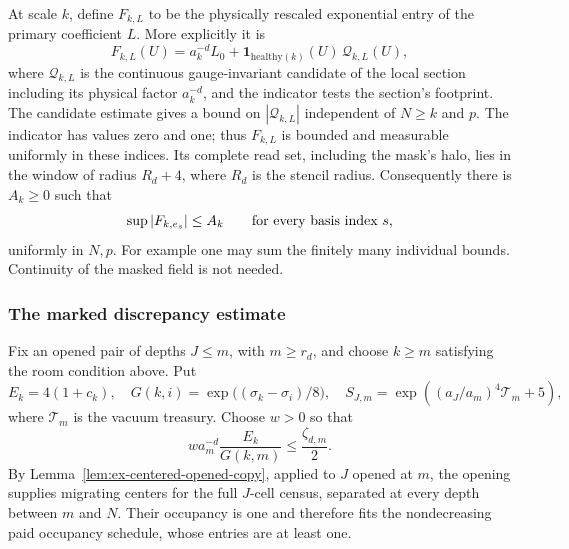 At scale $k$, define $F_{k,L}$ to be the physically rescaled exponential
entry of the primary coefficient $L$. More explicitly it is
\[
 F_{k,L}(U)=a_k^{-d}L_0+
       \mathbf1_{\mathrm{healthy}(k)}(U)\,\mathcal Q_{k,L}(U),
\]
where $\mathcal Q_{k,L}$ is the continuous gauge-invariant candidate of the
local section including its physical factor $a_k^{-d}$, and the indicator
tests the section's footprint. The
candidate estimate gives a bound on $|\mathcal Q_{k,L}|$ independent of
$N\geq k$ and $p$. The indicator has values zero and one; thus $F_{k,L}$
is bounded and measurable uniformly in these indices. Its complete read
set, including the mask's halo, lies in the window of radius $R_d+4$,
where $R_d$ is the stencil radius. Consequently there is $A_k\geq0$ such
that
\[
 \sup|F_{k,e_s}|\leq A_k\qquad\hbox{for every basis index }s,
\]
uniformly in $N,p$. For example one may sum the finitely many individual
bounds. Continuity of the masked field is not needed.

\subsubsection{The marked discrepancy estimate}

Fix an opened pair of depths $J\leq m$, with $m\geq r_d$, and choose
$k\geq m$ satisfying the room condition above. Put
\[
 E_k=4(1+c_k),\quad
 G(k,i)=\exp\bigl((\sigma_k-\sigma_i)/8\bigr),\quad
 S_{J,m}=\exp\left((a_J/a_m)^4\mathcal T_m+5\right),
\]
where $\mathcal T_m$ is the vacuum treasury. Choose $w>0$ so that
\begin{equation}\label{eq:actual-grid-price}
 w a_m^{-d}\frac{E_k}{G(k,m)}\leq\frac{\zeta_{d,m}}2.
\end{equation}
By Lemma~\ref{lem:ex-centered-opened-copy}, applied to $J$ opened at
$m$, the opening supplies migrating centers for the full $J$-cell census,
separated at every depth between $m$ and $N$. Their occupancy is one and
therefore fits the nondecreasing paid occupancy schedule, whose entries
are at least one.

